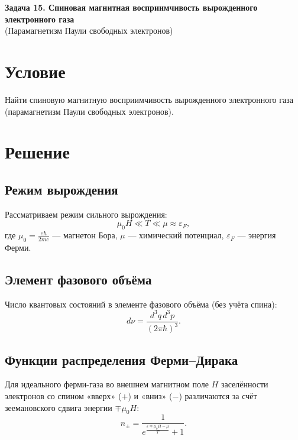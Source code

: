 \documentclass[12pt,a4paper]{article}
\begin{document}
\begin{center}
    {\large \textbf{Задача 15. Спиновая магнитная восприимчивость вырожденного электронного газа}}\\[0.5em]
    {\normalsize (Парамагнетизм Паули свободных электронов)}
\end{center}

\vspace{1em}

\section*{Условие}

Найти спиновую магнитную восприимчивость вырожденного электронного газа (парамагнетизм Паули свободных электронов).

\section*{Решение}

\subsection*{Режим вырождения}

Рассматриваем режим сильного вырождения:
\begin{equation}
    \mu_0 H \ll T \ll \mu \approx \varepsilon_F,
\end{equation}
где $\mu_0 = \frac{e\hbar}{2mc}$ — магнетон Бора, $\mu$ — химический потенциал, $\varepsilon_F$ — энергия Ферми.

\subsection*{Элемент фазового объёма}

Число квантовых состояний в элементе фазового объёма (без учёта спина):
\begin{equation}
    d\nu = \frac{d^3q\, d^3p}{(2\pi\hbar)^3}.
\end{equation}

\subsection*{Функции распределения Ферми–Дирака}

Для идеального ферми-газа во внешнем магнитном поле $H$ заселённости электронов со спином «вверх» ($+$) и «вниз» ($-$) различаются за счёт зеемановского сдвига энергии $\mp\mu_0 H$:
\begin{equation}
    n_\pm = \frac{1}{\displaystyle e^{\frac{\varepsilon \mp \mu_0 H - \mu}{T}} + 1}.
\end{equation}
\end{document}
